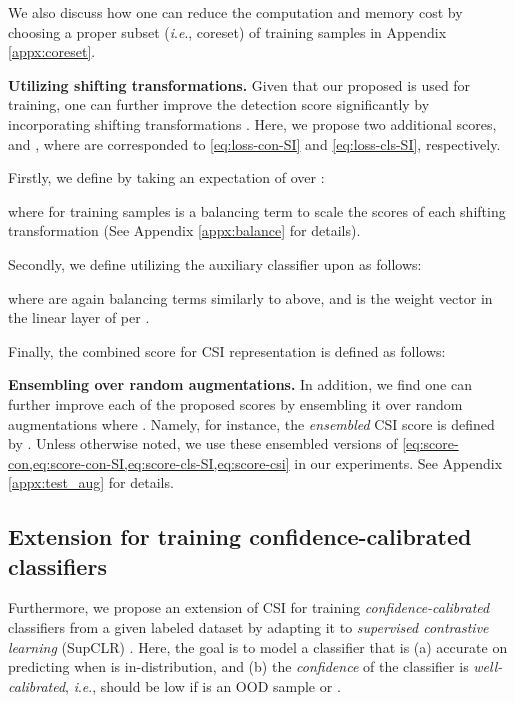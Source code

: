\documentclass{article}
\newcommand{\ie}{\textit{i}.\textit{e}.}
\begin{document}
We also discuss how one can reduce the computation and memory cost by choosing a proper subset (\ie, coreset) of training samples in Appendix \ref{appx:coreset}.


\textbf{Utilizing shifting transformations.}
Given that our proposed  is used for training, one can further improve the detection score  significantly by incorporating shifting transformations . Here, we propose two additional scores,  and , where are corresponded to  \eqref{eq:loss-con-SI} and  \eqref{eq:loss-cls-SI}, respectively.

Firstly, we define  by taking an expectation of  over :

where  for  training samples is a balancing term to scale the scores of each shifting transformation (See Appendix \ref{appx:balance} for details).

Secondly, we define  utilizing the auxiliary classifier  upon  as follows:

where  are again balancing terms similarly to above, and  is the weight vector in the linear layer of  per .


Finally, the combined score for CSI representation is defined as follows:


\textbf{Ensembling over random augmentations.}
In addition, we find one can further improve each of the proposed scores by ensembling it over random augmentations  where . Namely, for instance, the \textit{ensembled} CSI score is defined by . Unless otherwise noted, we use these ensembled versions of  \cref{eq:score-con,eq:score-con-SI,eq:score-cls-SI,eq:score-csi} in our experiments. See Appendix \ref{appx:test_aug} for details.


\vspace{-0.05in}
\subsection{Extension for training confidence-calibrated classifiers}
\vspace{-0.05in}
\label{sec:method-label}

Furthermore, we propose an extension of CSI for training \emph{confidence-calibrated} classifiers \citep{hendrycks2017baseline,lee2018training} from a given labeled dataset  by adapting it to \emph{supervised contrastive learning} (SupCLR) \citep{khosla2020supervised}. Here, the goal is to model a classifier  that is (a) accurate on predicting  when  is in-distribution, and (b) the \emph{confidence}  \citep{hendrycks2017baseline} of the classifier is \emph{well-calibrated}, \ie,  should be low if  is an OOD sample or .
\end{document}
